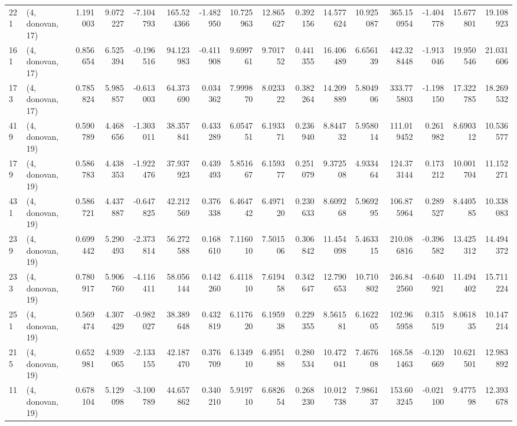 \begin{tabular}{llrrrrrrrrrrrrrr}
221 &  (4, donovan, 17) &   1.191003 &   9.072227 &  -7.104793 &   165.524366 &  -1.482950 &  10.725963 &  12.865627 &  0.392156 &  14.577624 &  10.925087 &   365.150954 & -1.404778 &  15.677801 &  19.108923 \\
161 &  (4, donovan, 17) &   0.856654 &   6.525394 &  -0.196516 &    94.123983 &  -0.411908 &   9.699761 &   9.701752 &  0.441355 &  16.406489 &   6.656139 &   442.328448 & -1.913046 &  19.950546 &  21.031606 \\
173 &  (4, donovan, 17) &   0.785824 &   5.985857 &  -0.613003 &    64.373690 &   0.034362 &   7.999870 &   8.023322 &  0.382264 &  14.209889 &   5.804906 &   333.775803 & -1.198150 &  17.322785 &  18.269532 \\
419 &  (4, donovan, 19) &   0.590789 &   4.468656 &  -1.303011 &    38.357841 &   0.433289 &   6.054751 &   6.193371 &  0.236940 &   8.844732 &   5.958014 &   111.019452 &  0.261982 &   8.690312 &  10.536577 \\
179 &  (4, donovan, 19) &   0.586783 &   4.438353 &  -1.922476 &    37.937923 &   0.439493 &   5.851667 &   6.159377 &  0.251079 &   9.372508 &   4.933464 &   124.373144 &  0.173212 &  10.001704 &  11.152271 \\
431 &  (4, donovan, 19) &   0.586721 &   4.437887 &  -0.647825 &    42.212569 &   0.376338 &   6.464742 &   6.497120 &  0.230633 &   8.609268 &   5.969295 &   106.875964 &  0.289527 &   8.440585 &  10.338083 \\
239 &  (4, donovan, 19) &   0.699442 &   5.290493 &  -2.373814 &    56.272588 &   0.168610 &   7.116010 &   7.501506 &  0.306842 &  11.454098 &   5.463315 &   210.086816 & -0.396582 &  13.425312 &  14.494372 \\
233 &  (4, donovan, 19) &   0.780917 &   5.906760 &  -4.116411 &    58.056144 &   0.142260 &   6.411810 &   7.619458 &  0.342647 &  12.790653 &  10.710802 &   246.842560 & -0.640921 &  11.494402 &  15.711224 \\
251 &  (4, donovan, 19) &   0.569474 &   4.307429 &  -0.982027 &    38.389648 &   0.432819 &   6.117620 &   6.195938 &  0.229355 &   8.561581 &   6.162205 &   102.965958 &  0.315519 &   8.061835 &  10.147214 \\
215 &  (4, donovan, 19) &   0.652981 &   4.939065 &  -2.133155 &    42.187470 &   0.376709 &   6.134910 &   6.495188 &  0.280534 &  10.472041 &   7.467608 &   168.581463 & -0.120669 &  10.621501 &  12.983892 \\
11  &  (4, donovan, 19) &   0.678104 &   5.129098 &  -3.100789 &    44.657862 &   0.340210 &   5.919710 &   6.682654 &  0.268230 &  10.012738 &   7.986137 &   153.603245 & -0.021100 &   9.477598 &  12.393678 \\

\end{tabular}
